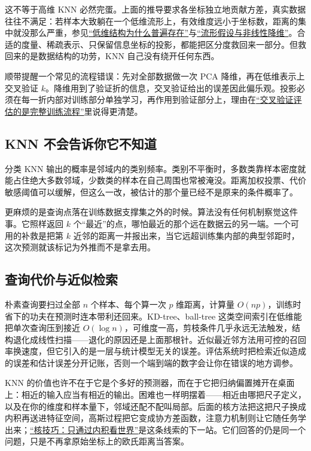 这不等于高维 KNN 必然完蛋。上面的推导要求各坐标独立地贡献方差，真实数据往往不满足：若样本大致躺在一个低维流形上，有效维度远小于坐标数，距离的集中就没那么严重，参见\hyperref[sec:12-Real-Analysis-Support/10-Essential-Structures/02]{``低维结构为什么普遍存在''}与\hyperref[sec:13-Machine-Learning/04-Dimensionality-Reduction/04]{``流形假设与非线性降维''}。合适的度量、稀疏表示、只保留信息坐标的投影，都能把区分度救回来一部分。但救回来的是数据结构的功劳，KNN 自己没有绕开任何东西。

顺带提醒一个常见的流程错误：先对全部数据做一次 PCA 降维，再在低维表示上交叉验证 \(k\)。降维用到了验证折的信息，交叉验证给出的误差因此偏乐观。投影必须在每一折内部对训练部分单独学习，再作用到验证部分上，理由在\hyperref[sec:11-Mathematical-Statistics/06-Resampling-and-Model-Selection/03]{``交叉验证评估的是完整训练流程''}里说得更清楚。

\subsection{KNN 不会告诉你它不知道}

分类 KNN 输出的概率是邻域内的类别频率。类别不平衡时，多数类靠样本密度就能占住绝大多数邻域，少数类的样本在自己周围也常被淹没。距离加权投票、代价敏感阈值可以缓解，但这么一改，被估计的那个量已经不是原来的条件概率了。

更麻烦的是查询点落在训练数据支撑集之外的时候。算法没有任何机制察觉这件事。它照样返回 \(k\) 个``最近''的点，哪怕最近的那个远在数据云的另一端。一个可用的补救是把第 \(k\) 近邻的距离一并报出来，当它远超训练集内部的典型邻距时，这次预测就该标记为外推而不是拿去用。

\subsection{查询代价与近似检索}

朴素查询要扫过全部 \(n\) 个样本、每个算一次 \(p\) 维距离，计算量 \(O(np)\)，训练时省下的功夫在预测时连本带利还回来。KD-tree、ball-tree 这类空间索引在低维能把单次查询压到接近 \(O(\log n)\)，可维度一高，剪枝条件几乎永远无法触发，结构退化成线性扫描——退化的原因还是上面那根针。近似最近邻方法用可控的召回率换速度，但它引入的是一层与统计模型无关的误差。评估系统时把检索近似造成的误差和估计误差分开记账，否则一个端到端的数字会让你在错误的地方调参。

KNN 的价值也许不在于它是个多好的预测器，而在于它把归纳偏置摊开在桌面上：相近的输入应当有相近的输出。困难也一样明摆着——相近由哪把尺子定义，以及在你的维度和样本量下，邻域还配不配叫局部。后面的核方法把这把尺子换成内积再送进特征空间，高斯过程把它变成协方差函数，注意力机制则让它随任务学出来；\hyperref[sec:13-Machine-Learning/09-Kernel-Methods-and-Gaussian-Processes/02]{``核技巧：只通过内积看世界''}是这条线索的下一站。它们回答的仍是同一个问题，只是不再拿原始坐标上的欧氏距离当答案。
